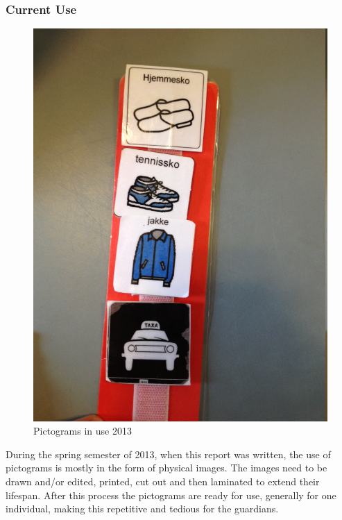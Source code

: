 \subsubsection*{Current Use}
\label{subsub:pic_currentuse}
\begin{figure}[!ht]
        \centering
        \includegraphics[scale=0.15]{cReport/img/current_use_picto.jpg}
        \caption{\label{img:pic_current} Pictograms in use 2013}
\end{figure}
During the spring semester of 2013, when this report was written, the use of pictograms is mostly in the form of physical images. The images need to be drawn and/or edited, printed, cut out and then laminated to extend their lifespan. After this process the pictograms are ready for use, generally for one individual, making this repetitive and tedious for the guardians.%
